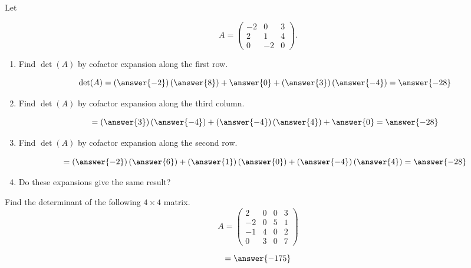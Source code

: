 \documentclass{ximera}
\begin{document}
\begin{exercise}

Let

\[A = \begin{pmatrix}
-2 & 0 & 3\\
2 & 1 & 4 \\
0 & -2 & 0
\end{pmatrix}.
\]

\begin{enumerate}
\item Find $\det(A)$ by cofactor expansion along the first row.

  \begin{prompt}
    \[
      \det(A) = \left(\answer{-2}\right)\left(\answer{8}\right) + \answer{0} + \left(\answer{3}\right)\left(\answer{-4}\right) = \answer{-28}
    \]
  \end{prompt}

\item Find $\det(A)$ by cofactor expansion along the third column.

  \begin{prompt}
    \[
      = \left(\answer{3}\right)\left(\answer{-4}\right) + \left(\answer{-4}\right) \left(\answer{4}\right) + \answer{0} = \answer{-28}
    \]
  \end{prompt}

\item Find $\det(A)$ by cofactor expansion along the second row.

  \begin{prompt}
    \[
      = \left(\answer{-2}\right)\left(\answer{6}\right) + \left(\answer{1}\right)\left(\answer{0}\right) + \left(\answer{-4}\right)\left(\answer{4}\right)= \answer{-28}
    \]
  \end{prompt}

\item Do these expansions give the same result?

  \begin{prompt}
    \begin{multipleChoice}
    \end{multipleChoice}
  \end{prompt}

\end{enumerate}

\end{exercise}
\begin{exercise}


Find the determinant of the following $4\times4$ matrix.
\[
A = \begin{pmatrix}
2 & 0 & 0 & 3\\
-2 & 0 & 5 & 1\\
-1 & 4 & 0 & 2\\
0 & 3 & 0 & 7
\end{pmatrix}
\]

\begin{prompt}
\[
= \answer{-175}
\]
\end{prompt}
\end{exercise}
\end{document}
